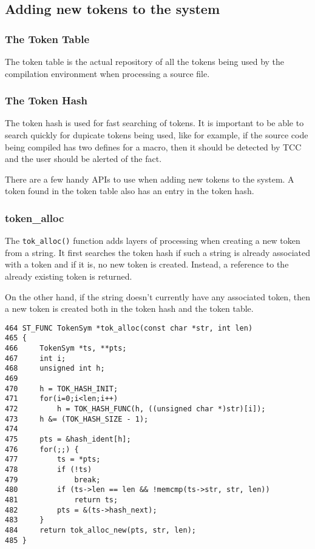\subsection{Adding new tokens to the system}




\subsubsection{The Token Table}

The token table is the actual repository of all the tokens being used by the compilation environment when processing a source file.

\subsubsection{The Token Hash}

The token hash is used for fast searching of tokens. It is important to be able to search quickly for dupicate tokens being used, like for example, if the source code being compiled has two defines for a macro, then it should be detected by TCC and the user should be alerted of the fact.

There are a few handy APIs to use when adding new tokens to the system. A token found in the token table also has an entry in the token hash.

\subsubsection{token\_alloc}

The \verb|tok_alloc()| function adds layers of processing when creating a new token from a string. It first searches the token hash if such a string is already associated with a token and if it is, no new token is created. Instead, a reference to the already existing token is returned.

On the other hand, if the string doesn't currently have any associated token, then a new token is created both in the token hash and the token table.

\begin{verbatim}
464 ST_FUNC TokenSym *tok_alloc(const char *str, int len)
465 {
466     TokenSym *ts, **pts;
467     int i;
468     unsigned int h;
469     
470     h = TOK_HASH_INIT;
471     for(i=0;i<len;i++)
472         h = TOK_HASH_FUNC(h, ((unsigned char *)str)[i]);
473     h &= (TOK_HASH_SIZE - 1);
474 
475     pts = &hash_ident[h];
476     for(;;) {
477         ts = *pts;
478         if (!ts)
479             break;
480         if (ts->len == len && !memcmp(ts->str, str, len))
481             return ts;
482         pts = &(ts->hash_next);
483     }
484     return tok_alloc_new(pts, str, len);
485 }
\end{verbatim}

